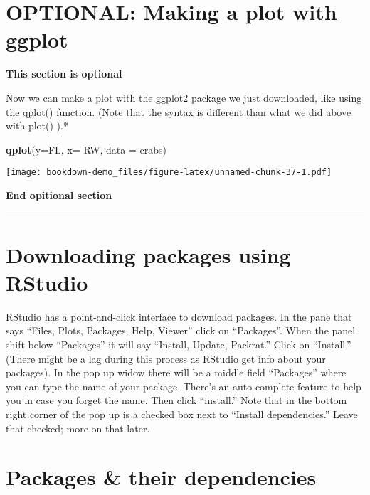 \documentclass[]{book}
\newenvironment{Shaded}{\begin{snugshade}}{\end{snugshade}}
\newcommand{\KeywordTok}[1]{\textcolor[rgb]{0.13,0.29,0.53}{\textbf{#1}}}
\newcommand{\DataTypeTok}[1]{\textcolor[rgb]{0.13,0.29,0.53}{#1}}
\newcommand{\NormalTok}[1]{#1}
\theoremstyle{definition}
\theoremstyle{definition}
\theoremstyle{definition}
\theoremstyle{remark}
\begin{document}
\section{OPTIONAL: Making a plot with
ggplot}\label{optional-making-a-plot-with-ggplot}

\textbf{This section is optional}

Now we can make a plot with the ggplot2 package we just downloaded, like
using the qplot() function. (Note that the syntax is different than what
we did above with plot() ).*

\begin{Shaded}
\begin{Highlighting}[]
\KeywordTok{qplot}\NormalTok{(}\DataTypeTok{y=}\NormalTok{FL, }\DataTypeTok{x=}\NormalTok{ RW, }\DataTypeTok{data =}\NormalTok{ crabs)}
\end{Highlighting}
\end{Shaded}

\texttt{[image: bookdown-demo\_files/figure-latex/unnamed-chunk-37-1.pdf]}

\textbf{End opitional section}

\begin{center}\rule{0.5\linewidth}{\linethickness}\end{center}

\section{\texorpdfstring{\protect\hyperlink{section-3}{} Downloading
packages using
RStudio}{ Downloading packages using RStudio}}\label{downloading-packages-using-rstudio}

RStudio has a point-and-click interface to download packages. In the
pane that says ``Files, Plots, Packages, Help, Viewer'' click on
``Packages''. When the panel shift below ``Packages'' it will say
``Install, Update, Packrat.'' Click on ``Install.'' (There might be a
lag during this process as RStudio get info about your packages). In the
pop up widow there will be a middle field ``Packages'' where you can
type the name of your package. There's an auto-complete feature to help
you in case you forget the name. Then click ``install.'' Note that in
the bottom right corner of the pop up is a checked box next to ``Install
dependencies.'' Leave that checked; more on that later.

\section{\texorpdfstring{\protect\hyperlink{section-3}{} Packages \&
their
dependencies}{ Packages \& their dependencies}}\label{packages-their-dependencies}
\end{document}
